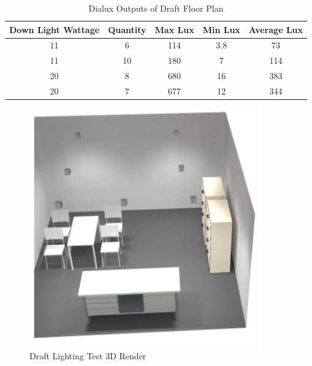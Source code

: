 \begin{table}[!ht]
\centering
\renewcommand{\arraystretch}{2}
\begin{tabular}{|c|c|c|c|c|}
\hline
\multicolumn{1}{|l|}{\textbf{Down Light Wattage}} & \multicolumn{1}{l|}{\textbf{Quantity}} & \multicolumn{1}{l|}{\textbf{Max Lux}} & \multicolumn{1}{l|}{\textbf{Min Lux}} & \multicolumn{1}{l|}{\textbf{Average Lux}} \\ \hline
11 & 6 & 114 & 3.8 & 73 \\ \hline
11 & 10 & 180 & 7 & 114 \\ \hline
20 & 8 & 680 & 16 & 383 \\ \hline
20 & 7 & 677 & 12 & 344 \\ \hline
\end{tabular}
\caption{Dialux Outputs of Draft Floor Plan}
\label{table:draftFloorPlanDialuxOutputs}
\end{table} 

\begin{figure}[H]
\hfill\includegraphics[width = 100mm]{images/lighting_draft_3D}\hspace*{\fill}
\caption{Draft Lighting Test 3D Render} 
\label{fig:DraftLighting3D}
\end{figure} 

